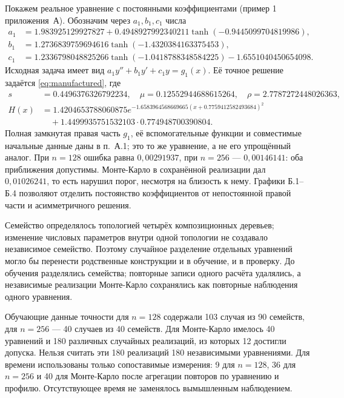 \clearpage
{}
Покажем реальное уравнение с постоянными коэффициентами (пример 1 приложения~А). Обозначим через $a_1,b_1,c_1$ числа
\begin{equation}\label{eq:realconstant}
\begin{aligned}
a_1&=1.983925129927827+0.4948927992340211\tanh(-0.9445099704819986),\\
b_1&=1.2736839759694616\tanh(-1.4320384163375453),\\
c_1&=1.2336798048825266\tanh(-1.0418788348584225)-1.6551040450654098.
\end{aligned}
\end{equation}
Исходная задача имеет вид $a_1y''+b_1y'+c_1y=g_1(x)$. Её точное решение задаётся \eqref{eq:manufactured}, где
\begin{equation}\label{eq:realexact}
\begin{aligned}
s&=0.4496376326792234,\quad \mu=0.12552944688615264,\quad \rho=2.7787272448026363,\\
H(x)&=1.4204653788060875e^{-1.6583964568669665(x+0.7759412582493684)^2}\\
&\quad+1.4499935751532103\cdot0.774948700390804.
\end{aligned}
\end{equation}
Полная замкнутая правая часть $g_1$, её вспомогательные функции и совместимые начальные данные даны в п.~А.1; это то же уравнение, а не его упрощённый аналог. При $n=128$ ошибка равна $0{,}00291937$, при $n=256$ --- $0{,}00146141$: оба приближения допустимы. Монте-Карло в сохранённой реализации дал $0{,}01026241$, то есть нарушил порог, несмотря на близость к нему. Графики Б.1--Б.4 позволяют отделить постоянство коэффициентов от непостоянной правой части и асимметричного решения.

Семейство определялось топологией четырёх композиционных деревьев; изменение числовых параметров внутри одной топологии не создавало независимое семейство. Поэтому случайное разделение отдельных уравнений могло бы перенести родственные конструкции и в обучение, и в проверку. До обучения разделялись семейства; повторные записи одного расчёта удалялись, а независимые реализации Монте-Карло сохранялись как повторные наблюдения одного уравнения.

Обучающие данные точности для $n=128$ содержали 103 случая из 90 семейств, для $n=256$ --- 40 случаев из 40 семейств. Для Монте-Карло имелось 40 уравнений и 180 различных случайных реализаций, из которых 12 достигли допуска. Нельзя считать эти 180 реализаций 180 независимыми уравнениями. Для времени использованы только сопоставимые измерения: 9 для $n=128$, 36 для $n=256$ и 40 для Монте-Карло после агрегации повторов по уравнению и профилю. Отсутствующее время не заменялось вымышленным наблюдением.

